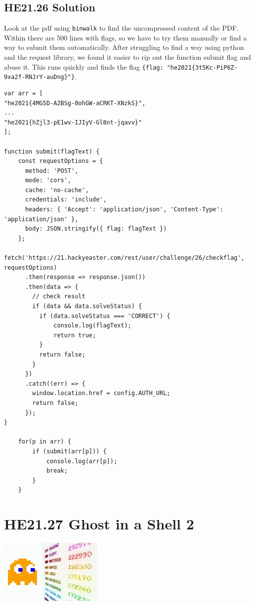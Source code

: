 \documentclass[english,a4paper,nols,noindent]{tufte-handout}
\begin{document}
\hypertarget{he21.26-solution}{%
\subsection{HE21.26 Solution}\label{he21.26-solution}}

\noindent Look at the pdf using \verb+binwalk+ to find the uncompressed content
of the PDF.  Within there are 500 lines with flags, so we have to try them
manually or find a way to submit them automatically.  After struggling to find
a way using python and the request library, we found it easier to rip out the
function submit flag and abuse it.  This runs quickly and finds the flag
\verb+{flag: "he2021{3t5Kc-PiP6Z-9xa2f-RNJrY-auDng}"}+.

\begin{verbatim}
var arr = [
"he2021{4MG5D-A2BSg-0ohGW-aCRKT-XNzkS}",
...
"he2021{hZjl3-pE1wv-IJIyV-Gl8nt-jqavv}"
];

function submit(flagText) {
    const requestOptions = {
      method: 'POST',
      mode: 'cors',
      cache: 'no-cache',
      credentials: 'include',
      headers: { 'Accept': 'application/json', 'Content-Type': 'application/json' },
      body: JSON.stringify({ flag: flagText })
    };
    fetch('https://21.hackyeaster.com/rest/user/challenge/26/checkflag', requestOptions)
      .then(response => response.json())
      .then(data => {
        // check result
        if (data && data.solveStatus) {
          if (data.solveStatus === 'CORRECT') {
              console.log(flagText);
              return true;
          }
          return false;
        }
      })
      .catch((err) => {
        window.location.href = config.AUTH_URL;
        return false;
      });
}

    for(p in arr) {
        if (submit(arr[p])) {
            console.log(arr[p]);
            break;
        }
    }
\end{verbatim} 

\hypertarget{he21.27}{%
  \section{HE21.27 Ghost in a Shell 2}
  \label{he21.27}}
\begin{marginfigure}
    \includegraphics[width=50mm]{images/challenge27.jpg}
\end{marginfigure}
\end{document}
